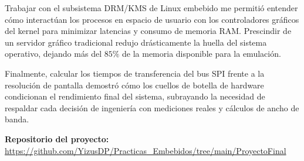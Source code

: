 \documentclass[conference]{IEEEtran}
\begin{document}
Trabajar con el subsistema DRM/KMS de Linux embebido me permitió entender cómo interactúan los procesos en espacio de usuario con los controladores gráficos del kernel para minimizar latencias y consumo de memoria RAM. Prescindir de un servidor gráfico tradicional redujo drásticamente la huella del sistema operativo, dejando más del $85\%$ de la memoria disponible para la emulación.

Finalmente, calcular los tiempos de transferencia del bus SPI frente a la resolución de pantalla demostró cómo los cuellos de botella de hardware condicionan el rendimiento final del sistema, subrayando la necesidad de respaldar cada decisión de ingeniería con mediciones reales y cálculos de ancho de banda.

\vspace{0.3cm}
\noindent\textbf{Repositorio del proyecto:} \\
\url{https://github.com/YizusDP/Practicas_Embebidos/tree/main/ProyectoFinal}
\end{document}
